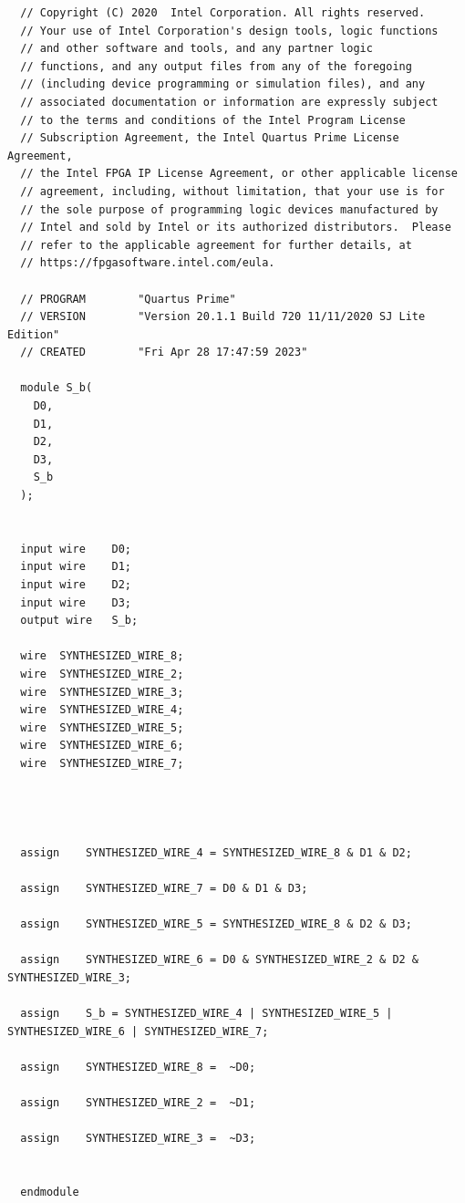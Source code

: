 \documentclass{article}
\begin{document}
\begin{lstlisting}
  // Copyright (C) 2020  Intel Corporation. All rights reserved.
  // Your use of Intel Corporation's design tools, logic functions 
  // and other software and tools, and any partner logic 
  // functions, and any output files from any of the foregoing 
  // (including device programming or simulation files), and any 
  // associated documentation or information are expressly subject 
  // to the terms and conditions of the Intel Program License 
  // Subscription Agreement, the Intel Quartus Prime License Agreement,
  // the Intel FPGA IP License Agreement, or other applicable license
  // agreement, including, without limitation, that your use is for
  // the sole purpose of programming logic devices manufactured by
  // Intel and sold by Intel or its authorized distributors.  Please
  // refer to the applicable agreement for further details, at
  // https://fpgasoftware.intel.com/eula.
  
  // PROGRAM		"Quartus Prime"
  // VERSION		"Version 20.1.1 Build 720 11/11/2020 SJ Lite Edition"
  // CREATED		"Fri Apr 28 17:47:59 2023"
  
  module S_b(
    D0,
    D1,
    D2,
    D3,
    S_b
  );
  
  
  input wire	D0;
  input wire	D1;
  input wire	D2;
  input wire	D3;
  output wire	S_b;
  
  wire	SYNTHESIZED_WIRE_8;
  wire	SYNTHESIZED_WIRE_2;
  wire	SYNTHESIZED_WIRE_3;
  wire	SYNTHESIZED_WIRE_4;
  wire	SYNTHESIZED_WIRE_5;
  wire	SYNTHESIZED_WIRE_6;
  wire	SYNTHESIZED_WIRE_7;
  
  
  
  
  assign	SYNTHESIZED_WIRE_4 = SYNTHESIZED_WIRE_8 & D1 & D2;
  
  assign	SYNTHESIZED_WIRE_7 = D0 & D1 & D3;
  
  assign	SYNTHESIZED_WIRE_5 = SYNTHESIZED_WIRE_8 & D2 & D3;
  
  assign	SYNTHESIZED_WIRE_6 = D0 & SYNTHESIZED_WIRE_2 & D2 & SYNTHESIZED_WIRE_3;
  
  assign	S_b = SYNTHESIZED_WIRE_4 | SYNTHESIZED_WIRE_5 | SYNTHESIZED_WIRE_6 | SYNTHESIZED_WIRE_7;
  
  assign	SYNTHESIZED_WIRE_8 =  ~D0;
  
  assign	SYNTHESIZED_WIRE_2 =  ~D1;
  
  assign	SYNTHESIZED_WIRE_3 =  ~D3;
  
  
  endmodule
   
\end{lstlisting}
\end{document}
